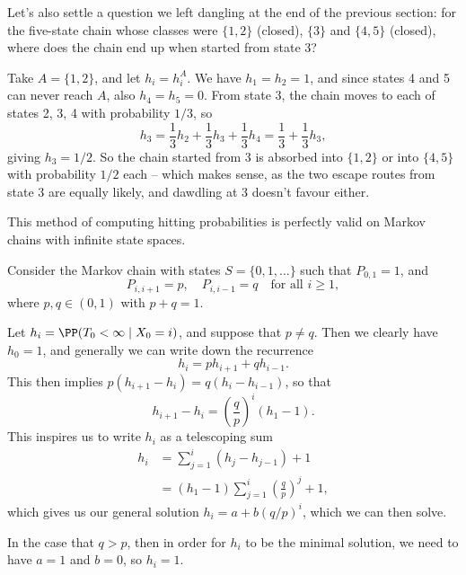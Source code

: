 Let's also settle a question we left dangling at the end of the previous section: for the five-state chain whose classes were $\{1, 2\}$ (closed), $\{3\}$ and $\{4, 5\}$ (closed), where does the chain end up when started from state 3?

\begin{example}
	Take $A = \{1, 2\}$, and let $h_i = h_i^A$. We have $h_1 = h_2 = 1$, and since states 4 and 5 can never reach $A$, also $h_4 = h_5 = 0$. From state 3, the chain moves to each of states 2, 3, 4 with probability $1/3$, so
	$$
	h_3 = \frac{1}{3}h_2 + \frac{1}{3}h_3 + \frac{1}{3}h_4 = \frac{1}{3} + \frac{1}{3}h_3,
	$$
	giving $h_3 = 1/2$. So the chain started from 3 is absorbed into $\{1, 2\}$ or into $\{4, 5\}$ with probability $1/2$ each -- which makes sense, as the two escape routes from state 3 are equally likely, and dawdling at 3 doesn't favour either.
\end{example}

This method of computing hitting probabilities is perfectly valid on Markov chains with infinite state spaces.

\begin{example}
	Consider the Markov chain with states $S = \{0, 1, \dots\}$ such that $P_{0, 1} = 1$, and
	$$
	P_{i, i+1} = p, \quad P_{i, i - 1} = q \quad \text{for all } i \geq 1,
	$$ 
	where $p, q \in (0, 1)$ with $p + q = 1$.

	\begin{center}
		\end{center}

	Let $h_i = \PP(T_0 < \infty \mid X_0 = i)$, and suppose that $p \neq q$. Then we clearly have $h_0 = 1$, and generally we can write down the recurrence 
	$$
		h_i = p h_{i + 1} + qh_{i - 1}.
	$$
	This then implies $p(h_{i + 1} - h_i) = q(h_{i} - h_{i - 1})$, so that
	$$
		h_{i+1} - h_{i}  = \left(\frac{q}{p}\right)^i (h_1 - 1).
	$$
	This inspires us to write $h_i$ as a telescoping sum
	\begin{align*}
		h_i &= \sum_{j = 1}^i (h_j - h_{j - 1}) + 1  \\
			&= (h_1 - 1) \sum_{j = 1}^i \left(\frac{q}{p}\right)^j + 1,
	\end{align*}
	which gives us our general solution $h_i = a + b(q/p)^i$, which we can then solve.

	In the case that $q > p$, then in order for $h_i$ to be the minimal solution, we need to have $a = 1$ and $b = 0$, so $h_i = 1$.
\end{example}

